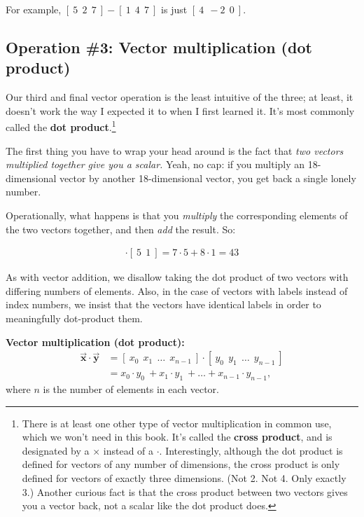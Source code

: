 For example, $[\ 5\ \ 2\ \ 7\ ] - [\ 1\ \ 4\ \ 7\ ]$ is just $[\ 4\ \ -2\ \ 0\ ]$.

\subsection{Operation \#3: Vector multiplication (dot product)}

\label{dotProduct}

Our third and final vector operation is the least intuitive of the three; at
least, it doesn't work the way I expected it to when I first learned it. It's
most commonly called the \textbf{dot product}.\footnote{There is at least one
other type of vector multiplication in common use, which we won't need in this
book. It's called the \textbf{cross product}, and is designated by a $\times$
instead of a $\cdot$. Interestingly, although the dot product is defined for
vectors of any number of dimensions, the cross product is only defined for
vectors of exactly three dimensions. (Not 2. Not 4. Only exactly 3.) Another
curious fact is that the cross product between two vectors gives you a vector
back, not a scalar like the dot product does.}

The first thing you have to wrap your head around is the fact that \textit{two
vectors multiplied together give you a scalar.} Yeah, no cap: if you multiply
an 18-dimensional vector by another 18-dimensional vector, you get back a
single lonely number.

Operationally, what happens is that you \textit{multiply} the corresponding
elements of the two vectors together, and then \textit{add} the result. So:

\vspace{-.15in}
\begin{align*}
[\ 7\ \ 8\ ] \cdot [\ 5\ \ 1\ ] = 7\cdot 5 + 8\cdot1 = 43
\end{align*}
\vspace{-.15in}

As with vector addition, we disallow taking the dot product of two vectors with
differing numbers of elements. Also, in the case of vectors with labels instead
of index numbers, we insist that the vectors have identical labels in order to
meaningfully dot-product them.

\begin{center}
\begin{framed}
\textbf{Vector multiplication (dot product):}
\begin{align*}
\overrightarrow{\textbf{x}} \cdot \overrightarrow{\textbf{y}} &=
[\ x_0\ \ x_1\ \ \dots \ \ x_{n-1}\ ] \cdot
[\ y_0\ \ y_1\ \ \dots \ \ y_{n-1}\ ] \\
&= x_0 \cdot y_0\ + x_1 \cdot y_1\ + \dots + x_{n-1} \cdot y_{n-1},
\end{align*}
where $n$ is the number of elements in each vector.
\end{framed}
\end{center}
\vspace{-.15in}

